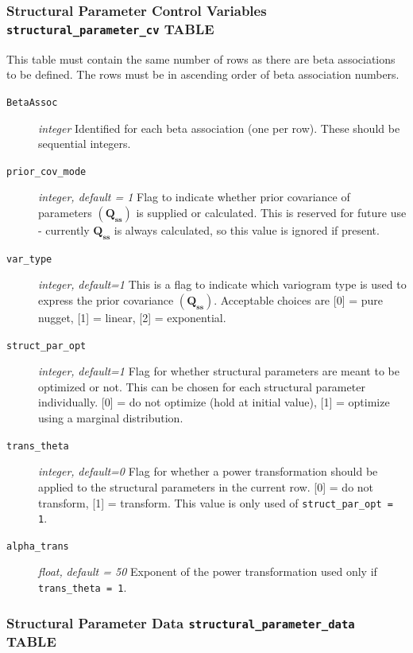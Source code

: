 \documentclass[11pt,oneside,onecolumn]{usgsreport}
\begin{document}
\begin{appendix}
\begin{bibunit}
\subsubsection{Structural Parameter Control Variables \texttt{structural\_parameter\_cv}
TABLE}

This table must contain the same number of rows as there are beta
associations to be defined. The rows must be in ascending order of
beta association numbers.
\begin{description}
\item [{\texttt{BetaAssoc}}] \emph{integer }Identified for each beta association
(one per row). These should be sequential integers.
\item [{\texttt{prior\_cov\_mode}}] \emph{integer, default = 1 }Flag to
indicate whether prior covariance of parameters $\left(\mathbf{Q}_{\mathbf{ss}}\right)$
is supplied or calculated. This is reserved for future use - currently
$\mathbf{Q_{ss}}$ is always calculated, so this value is ignored
if present. 
\item [{\texttt{var\_type}}] \emph{integer, }\textit{default=1}\emph{ }This
is a flag to indicate which variogram type is used to express the
prior covariance $\left(\mathbf{Q}_{\mathbf{ss}}\right)$. Acceptable
choices are {[}0{]} = pure nugget, {[}1{]} = linear, {[}2{]} = exponential.

\item [{\texttt{struct\_par\_opt}}] \emph{integer, }\textit{default=1}\emph{
}Flag for whether structural parameters are meant to be optimized
or not. This can be chosen for each structural parameter individually.
{[}0{]} = do not optimize (hold at initial value), {[}1{]} = optimize
using a marginal distribution. 
\item [{\texttt{trans\_theta}}] \emph{integer, }\textit{default=0}\emph{
}Flag for whether a power transformation should be applied to the
structural parameters in the current row. {[}0{]} = do not transform,
{[}1{]} = transform. This value is only used of \texttt{struct\_par\_opt
= 1}. 
\item [{\texttt{alpha\_trans}}] \emph{float, }\textit{default = 50} Exponent
of the power transformation used only if \texttt{trans\_theta = 1}.

\end{description}

\subsubsection{Structural Parameter Data \texttt{structural\_parameter\_data} TABLE}


\end{bibunit}
\end{appendix}
\end{document}
